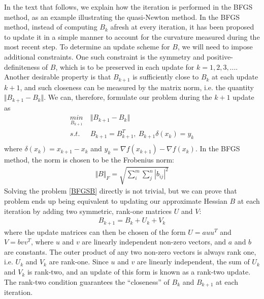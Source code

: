 	In the text that follows, we explain how the iteration is performed in the BFGS method, as an example illustrating the quasi-Newton method. In the BFGS method, instead of computing $B_k$ afresh at every iteration, it has been proposed to update it in a simple manner to account for the curvature measured during the most recent step. To determine an update scheme for $B$, we will need to impose additional constraints. One such constraint is the symmetry and positive-definiteness of $B$, which is to be preserved in each update for $k = 1,2, 3, ...$. Another desirable property is that $B_{k+1}$ is sufficiently close to $B_k$ at each update $k+1$, and such closeness can be measured by the matrix norm, i.e. the quantity $\Vert B_{k+1} - B_{k} \Vert$. We can, therefore, formulate our problem during the $k+1$ update as 
	\begin{equation}
		\begin{aligned}
			\underset{B_{k+1}}{min} \  &  \Vert B_{k+1} - B_{k} \Vert\\
			s.t.\ \  & B_{k+1}= B_{k+1}^T, \ B_{k+1}\delta(x_k)  = y_k \\
		\end{aligned}
		\label{BFGSB}
	\end{equation}
	where $\delta(x_k) = x_{k+1} -x_k$ and $y_k = \nabla f(x_{k+1}) - \nabla f(x_k)$. In the BFGS method, the norm is chosen to be the Frobenius norm:
	\begin{align*}
		\Vert B \Vert_F = \sqrt{\sum_{i}^{m} \sum_{j}^{n} |b_{ij}|^2} 
	\end{align*}
	Solving the problem \ref{BFGSB} directly is not trivial, but we can prove that problem ends up being equivalent to updating our approximate Hessian $B$ at each iteration by adding two symmetric, rank-one matrices $U$ and $V$:
	\begin{align*}
		B_{k+1} = B_k + U_k + V_k
	\end{align*}
	where the update matrices can then be chosen of the form $U = a u u^T$ and $V = b v v^T$, where $u$ and $v$ are linearly independent non-zero vectors, and $a$ and $b$ are constants.  The outer product of any two non-zero vectors is always rank one, i.e. $U_k$ and $V_k$ are rank-one. Since $u$ and $v$ are linearly independent, the sum of $U_k$ and $V_k$ is rank-two, and an update of this form is known as a rank-two update. The rank-two condition guarantees the “closeness” of $B_k$ and $B_{k+1}$ at each iteration. 
	
